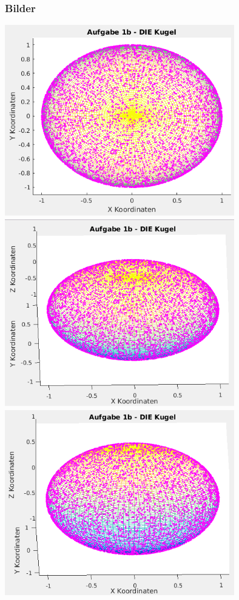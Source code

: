 \documentclass[12pt]{article}
\begin{document}
\subsubsection{Bilder}
\begin{center}
\includegraphics[width=10cm]{kugel01.png}
\includegraphics[width=10cm]{kugel02.png}
\includegraphics[width=10cm]{kugel03.png}
\end{center}
\end{document}

